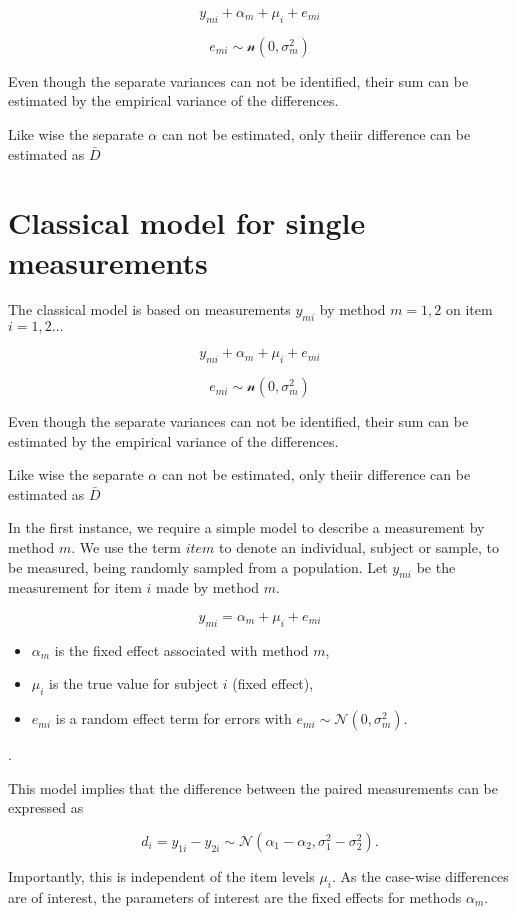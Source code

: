 \documentclass[12pt, a4paper]{report}
\theoremstyle{plain}
\theoremstyle{definition}
\theoremstyle{remark}
\begin{document}
\[y_{mi} + \alpha_{m} + \mu_{i} + e_{mi}\]

\[e_{mi} \sim \mathcal{n} (0,\sigma^2_m)\]

Even though the separate variances can not be
identified, their sum can be estimated by the empirical variance of the differences.

Like wise the separate $\alpha$ can not be
estimated, only theiir difference can be estimated as
$\bar{D}$

\section{Classical model for single measurements}
The classical model is based on measurements $y_{mi}$
by method $m=1,2$ on item $i = 1,2 \ldots$

\[y_{mi} + \alpha_{m} + \mu_{i} + e_{mi}\]

\[e_{mi} \sim \mathcal{n} (0,\sigma^2_m)\]

Even though the separate variances can not be
identified, their sum can be estimated by the empirical variance of the differences.

Like wise the separate $\alpha$ can not be
estimated, only theiir difference can be estimated as
$\bar{D}$


In the first instance, we require a simple model to describe a measurement by method $m$. We use the term $item$ to denote an individual, subject or sample, to be measured, being randomly sampled from a population. Let $y_{mi}$ be the measurement for item $i$ made by method $m$.

\[ y_{mi} = \alpha_{m} + \mu_{i} + e_{mi}  \]

\begin{itemize}
	\item $\alpha_m$ is the fixed effect associated with method $m$,
	\item $\mu_i$ is the true value for subject $i$ (fixed effect),
	\item $e_{mi}$ is a
	random effect term for errors with $e_{mi}  \sim \mathcal{N}(0,\sigma^2_m)$. \end{itemize}.

This model implies that the difference between the paired measurements can be expressed as

\[ d_{i} = y_{1i} - y_{2i} \sim \mathcal{N} (\alpha_{1} - \alpha_{2}, \sigma^2_{1} - \sigma^2_{2}). \]

Importantly, this is independent of the item levels $\mu_i$. As the case-wise differences are of interest, the parameters of interest are the fixed effects for methods $\alpha_{m}$.
\end{document}

